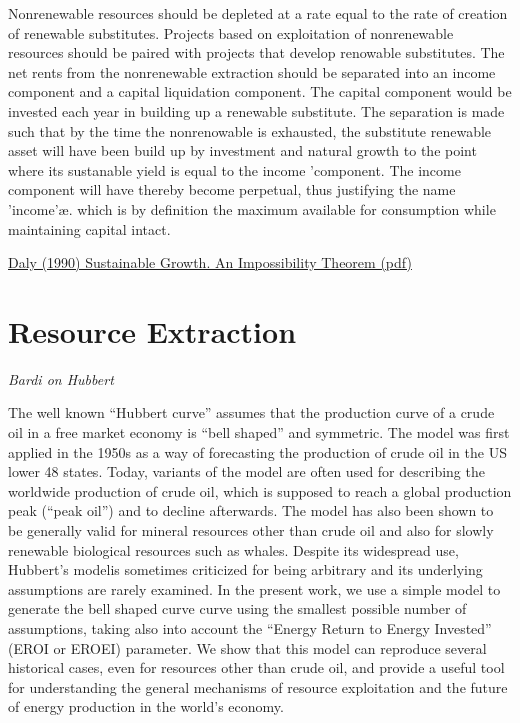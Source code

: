 \documentclass[
]{book}
\begin{document}
Nonrenewable resources should be depleted at a rate equal to the rate of creation
of renewable substitutes.
Projects based on exploitation of nonrenewable resources should be paired
with projects that develop renowable substitutes.
The net rents from the nonrenewable extraction should be separated into an
income component and a capital liquidation component.
The capital component would be invested each year in building up a renewable
substitute.
The separation is made such that by the time the nonrenowable is exhausted,
the substitute renewable asset will have been build up by investment and
natural growth to the point where its sustanable yield is equal to the income
'component.
The income component will have thereby become perpetual, thus justifying
the name 'income'æ. which is by definition the maximum available for
consumption while maintaining capital intact.

\href{pdf/Daly_1990_Sustainable_Growth_An_Impossibility_Theorem.pdf}{Daly (1990) Sustainable Growth. An Impossibility Theorem (pdf)}

\hypertarget{resource-extraction}{%
\section{Resource Extraction}\label{resource-extraction}}

\emph{Bardi on Hubbert}

The well known ``Hubbert curve'' assumes that the production curve of a crude
oil in a free market economy is ``bell shaped'' and symmetric. The model was first applied
in the 1950s as a way of forecasting the production of crude oil in the US lower 48 states.
Today, variants of the model are often used for describing the worldwide production of
crude oil, which is supposed to reach a global production peak (``peak oil'') and to decline
afterwards. The model has also been shown to be generally valid for mineral resources
other than crude oil and also for slowly renewable biological resources such as whales.
Despite its widespread use, Hubbert's modelis sometimes criticized for being arbitrary and
its underlying assumptions are rarely examined. In the present work, we use a simple
model to generate the bell shaped curve curve using the smallest possible number of
assumptions, taking also into account the ``Energy Return to Energy Invested''
(EROI or EROEI) parameter. We show that this model can reproduce several historical
cases, even for resources other than crude oil, and provide a useful tool for understanding
the general mechanisms of resource exploitation and the future of energy production in the
world's economy.
\end{document}
